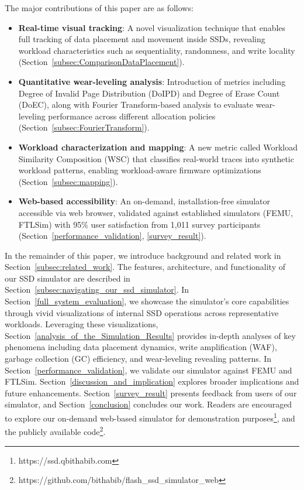 \documentclass{ieeeaccess}
\begin{document}
The major contributions of this paper are as follows:
\begin{itemize}
 \item \textbf{Real-time visual tracking}: A novel visualization technique that enables full tracking of data placement and movement inside SSDs, revealing workload characteristics such as sequentiality, randomness, and write locality (Section~\ref{subsec:ComparisonDataPlacement}).
 \item \textbf{Quantitative wear-leveling analysis}: Introduction of metrics including Degree of Invalid Page Distribution (DoIPD) and Degree of Erase Count (DoEC), along with Fourier Transform-based analysis to evaluate wear-leveling performance across different allocation policies (Section~\ref{subsec:FourierTransform}).
 \item \textbf{Workload characterization and mapping}: A new metric called Workload Similarity Composition (WSC) that classifies real-world traces into synthetic workload patterns, enabling workload-aware firmware optimizations (Section~\ref{subsec:mapping}).
 \item \textbf{Web-based accessibility}: An on-demand, installation-free simulator accessible via web browser, validated against established simulators (FEMU, FTLSim) with 95\% user satisfaction from 1,011 survey participants (Section~\ref{performance_validation}, \ref{survey_result}).
\end{itemize}

In the remainder of this paper, we introduce background and related work in Section~\ref{subsec:related_work}.
The features, architecture, and functionality of our SSD simulator are described in Section~\ref{subsec:navigating_our_ssd_simulator}.
In Section~\ref{full_system_evaluation}, we showcase the simulator's core capabilities through vivid visualizations of internal SSD operations across representative workloads. Leveraging these visualizations, Section~\ref{analysis_of_the_Simulation_Results} provides in-depth analyses of key phenomena including data placement dynamics, write amplification (WAF), garbage collection (GC) efficiency, and wear-leveling revealing patterns. In Section~\ref{performance_validation}, we validate our simulator against FEMU and FTLSim. Section~\ref{discussion_and_implication} explores broader implications and future enhancements. Section~\ref{survey_result} presents feedback from users of our simulator, and Section~\ref{conclusion} concludes our work.
Readers are encouraged to explore our on-demand web-based simulator for demonstration purposes\footnote{https://ssd.qbithabib.com}, and the publicly available code\footnote{https://github.com/bithabib/flash\_ssd\_simulator\_web}.
\end{document}
